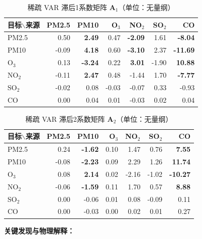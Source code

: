 \documentclass[UTF8,a4paper,12pt]{ctexart}
\begin{document}
\begin{table}[H]
\centering
\caption{稀疏 VAR 滞后1系数矩阵 $\mathbf{A}_1$（单位：无量纲）}
\label{tab:var_coef_lag1}
\small
\begin{tabular}{lrrrrrr}
\toprule
目标$\backslash$来源 & PM2.5 & PM10 & O$_3$ & NO$_2$ & SO$_2$ & CO\\
\midrule
PM2.5 & 0.50 & \textbf{2.49} & 0.47 & \textbf{-2.09} & 1.61 & \textbf{-8.04}\\
PM10 & -0.09 & \textbf{4.18} & 0.60 & \textbf{-3.10} & 2.37 & \textbf{-11.69}\\
O$_3$ & 0.13 & \textbf{-3.24} & 0.22 & \textbf{3.01} & -1.90 & \textbf{10.88}\\
NO$_2$ & -0.11 & \textbf{2.47} & 0.48 & -1.44 & 1.70 & \textbf{-7.77}\\
SO$_2$ & -0.02 & 0.08 & -0.03 & -0.07 & 0.33 & -0.93\\
CO & 0.00 & 0.04 & 0.01 & -0.03 & 0.02 & 0.04\\
\bottomrule
\end{tabular}
\end{table}

\begin{table}[H]
\centering
\caption{稀疏 VAR 滞后2系数矩阵 $\mathbf{A}_2$（单位：无量纲）}
\label{tab:var_coef_lag2}
\small
\begin{tabular}{lrrrrrr}
\toprule
目标$\backslash$来源 & PM2.5 & PM10 & O$_3$ & NO$_2$ & SO$_2$ & CO\\
\midrule
PM2.5 & 0.24 & \textbf{-1.62} & 0.10 & 1.47 & 0.76 & \textbf{7.55}\\
PM10 & -0.08 & \textbf{-2.23} & 0.09 & 2.29 & 1.26 & \textbf{11.74}\\
O$_3$ & 0.08 & \textbf{2.14} & 0.02 & -2.16 & -1.02 & \textbf{-10.27}\\
NO$_2$ & -0.06 & \textbf{-1.59} & 0.11 & 1.70 & 0.57 & \textbf{8.88}\\
SO$_2$ & 0.00 & -0.06 & 0.01 & 0.08 & -0.09 & 0.11\\
CO & 0.00 & -0.03 & 0.00 & 0.02 & 0.01 & 0.27\\
\bottomrule
\end{tabular}
\end{table}

\textbf{关键发现与物理解释：}
\end{document}
